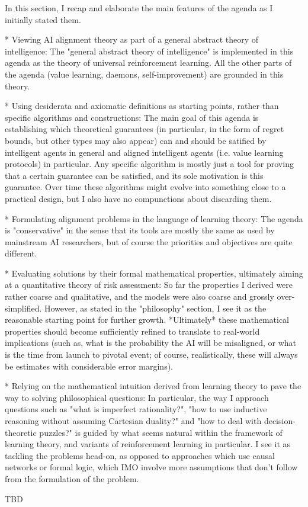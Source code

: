 \documentclass[a4paper]{article}
\begin{document}
In this section, I recap and elaborate the main features of the agenda as I initially stated them.

* Viewing AI alignment theory as part of a general abstract theory of intelligence: The "general abstract theory of intelligence" is implemented in this agenda as the theory of universal reinforcement learning. All the other parts of the agenda (value learning, daemons, self-improvement) are grounded in this theory.

* Using desiderata and axiomatic definitions as starting points, rather than specific algorithms and constructions: The main goal of this agenda is establishing which theoretical guarantees (in particular, in the form of regret bounds, but other types may also appear) can and should be satified by intelligent agents in general and aligned intelligent agents (i.e. value learning protocols) in particular. Any specific algorithm is mostly just a tool for proving that a certain guarantee can be satisfied, and its sole motivation is this guarantee. Over time these algorithms might evolve into something close to a practical design, but I also have no compunctions about discarding them.

* Formulating alignment problems in the language of learning theory: The agenda is "conservative" in the sense that its tools are mostly the same as used by mainstream AI researchers, but of course the priorities and objectives are quite different.

* Evaluating solutions by their formal mathematical properties, ultimately aiming at a quantitative theory of risk assessment: So far the properties I derived were rather coarse and qualitative, and the models were also coarse and grossly over-simplified. However, as stated in the "philosophy" section, I see it as the reasonable starting point for further growth. *Ultimately* these mathematical properties should become sufficiently refined to translate to real-world implications (such as, what is the probability the AI will be misaligned, or what is the time from launch to pivotal event; of course, realistically, these will always be estimates with considerable error margins).

* Relying on the mathematical intuition derived from learning theory to pave the way to solving philosophical questions: In particular, the way I approach questions such as "what is imperfect rationality?", "how to use inductive reasoning without assuming Cartesian duality?" and "how to deal with decision-theoretic puzzles?" is guided by what seems natural within the framework of learning theory, and variants of reinforcement learning in particular. I see it as tackling the problems head-on, as opposed to approaches which use causal networks or formal logic, which IMO involve more assumptions that don't follow from the formulation of the problem.


TBD
\end{document}
